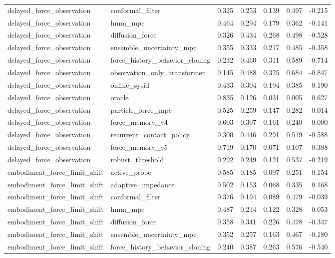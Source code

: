 \documentclass{article}
\begin{document}
\begin{longtable}{llrrrrr}
delayed\_force\_observation & conformal\_filter & 0.325 & 0.253 & 0.139 & 0.497 & -0.215 \\
delayed\_force\_observation & hmm\_mpc & 0.464 & 0.294 & 0.179 & 0.362 & -0.141 \\
delayed\_force\_observation & diffusion\_force & 0.326 & 0.434 & 0.268 & 0.498 & -0.528 \\
delayed\_force\_observation & ensemble\_uncertainty\_mpc & 0.355 & 0.333 & 0.217 & 0.485 & -0.358 \\
delayed\_force\_observation & force\_history\_behavior\_cloning & 0.232 & 0.460 & 0.311 & 0.589 & -0.714 \\
delayed\_force\_observation & observation\_only\_transformer & 0.145 & 0.488 & 0.325 & 0.684 & -0.847 \\
delayed\_force\_observation & online\_sysid & 0.433 & 0.304 & 0.194 & 0.385 & -0.190 \\
delayed\_force\_observation & oracle & 0.835 & 0.126 & 0.031 & 0.005 & 0.627 \\
delayed\_force\_observation & particle\_force\_mpc & 0.525 & 0.259 & 0.147 & 0.282 & 0.014 \\
delayed\_force\_observation & force\_memory\_v4 & 0.603 & 0.307 & 0.161 & 0.240 & -0.000 \\
delayed\_force\_observation & recurrent\_contact\_policy & 0.300 & 0.446 & 0.291 & 0.519 & -0.588 \\
delayed\_force\_observation & force\_memory\_v5 & 0.719 & 0.170 & 0.071 & 0.107 & 0.388 \\
delayed\_force\_observation & robust\_threshold & 0.292 & 0.249 & 0.121 & 0.537 & -0.219 \\
embodiment\_force\_limit\_shift & active\_probe & 0.585 & 0.185 & 0.097 & 0.251 & 0.154 \\
embodiment\_force\_limit\_shift & adaptive\_impedance & 0.502 & 0.153 & 0.068 & 0.335 & 0.168 \\
embodiment\_force\_limit\_shift & conformal\_filter & 0.376 & 0.194 & 0.089 & 0.479 & -0.039 \\
embodiment\_force\_limit\_shift & hmm\_mpc & 0.487 & 0.214 & 0.122 & 0.328 & 0.053 \\
embodiment\_force\_limit\_shift & diffusion\_force & 0.358 & 0.341 & 0.226 & 0.478 & -0.347 \\
embodiment\_force\_limit\_shift & ensemble\_uncertainty\_mpc & 0.352 & 0.257 & 0.163 & 0.467 & -0.180 \\
embodiment\_force\_limit\_shift & force\_history\_behavior\_cloning & 0.240 & 0.387 & 0.263 & 0.576 & -0.540 \\

\end{longtable}
\end{document}
